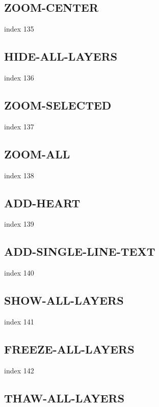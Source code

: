\documentclass[a4paper]{report}
\begin{document}
{{{{{{{{{{{{{\subsection{ZOOM-CENTER}

index 135

\subsection{HIDE-ALL-LAYERS}

index 136

\subsection{ZOOM-SELECTED}

index 137

\subsection{ZOOM-ALL}

index 138

\subsection{ADD-HEART}

index 139

\subsection{ADD-SINGLE-LINE-TEXT}

index 140

\subsection{SHOW-ALL-LAYERS}

index 141

\subsection{FREEZE-ALL-LAYERS}

index 142

\subsection{THAW-ALL-LAYERS}

}}}}}}}}}}}}}
\end{document}

